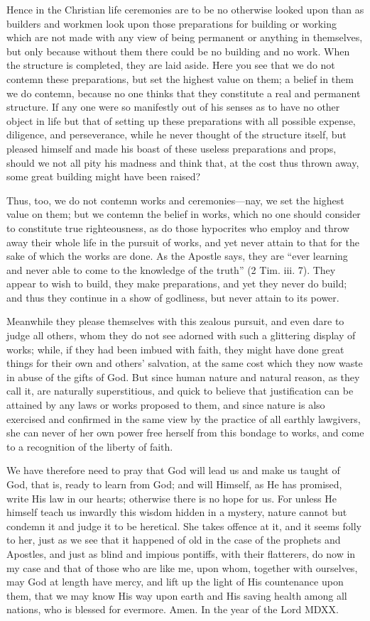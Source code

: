 Hence in the Christian life ceremonies are to be no otherwise looked upon
than as builders and workmen look upon those preparations for building or
working which are not made with any view of being permanent or anything in
themselves, but only because without them there could be no building and
no work. When the structure is completed, they are laid aside. Here you
see that we do not contemn these preparations, but set the highest value
on them; a belief in them we do contemn, because no one thinks that they
constitute a real and permanent structure. If any one were so manifestly
out of his senses as to have no other object in life but that of setting
up these preparations with all possible expense, diligence, and
perseverance, while he never thought of the structure itself, but pleased
himself and made his boast of these useless preparations and props, should
we not all pity his madness and think that, at the cost thus thrown away,
some great building might have been raised?

Thus, too, we do not contemn works and ceremonies—nay, we set the
highest value on them; but we contemn the belief in works, which no one
should consider to constitute true righteousness, as do those hypocrites
who employ and throw away their whole life in the pursuit of works, and
yet never attain to that for the sake of which the works are done. As the
Apostle says, they are ``ever learning and never able to come to the
knowledge of the truth'' (2 Tim. iii. 7). They appear to wish to build,
they make preparations, and yet they never do build; and thus they
continue in a show of godliness, but never attain to its power.

Meanwhile they please themselves with this zealous pursuit, and even dare
to judge all others, whom they do not see adorned with such a glittering
display of works; while, if they had been imbued with faith, they might
have done great things for their own and others' salvation, at the same
cost which they now waste in abuse of the gifts of God. But since human
nature and natural reason, as they call it, are naturally superstitious,
and quick to believe that justification can be attained by any laws or
works proposed to them, and since nature is also exercised and confirmed
in the same view by the practice of all earthly lawgivers, she can never
of her own power free herself from this bondage to works, and come to a
recognition of the liberty of faith.

We have therefore need to pray that God will lead us and make us taught of
God, that is, ready to learn from God; and will Himself, as He has
promised, write His law in our hearts; otherwise there is no hope for us.
For unless He himself teach us inwardly this wisdom hidden in a mystery,
nature cannot but condemn it and judge it to be heretical. She takes
offence at it, and it seems folly to her, just as we see that it happened
of old in the case of the prophets and Apostles, and just as blind and
impious pontiffs, with their flatterers, do now in my case and that of
those who are like me, upon whom, together with ourselves, may God at
length have mercy, and lift up the light of His countenance upon them,
that we may know His way upon earth and His saving health among all
nations, who is blessed for evermore. Amen. In the year of the Lord MDXX.
